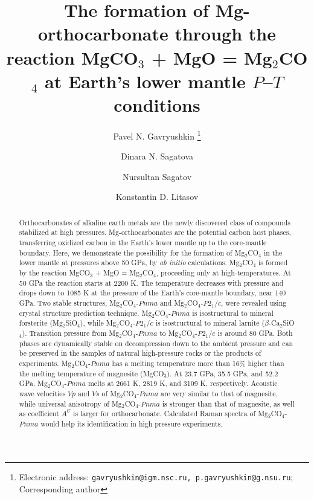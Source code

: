 \documentclass[a4paperm]{article}
\begin{document}

\title{The formation of Mg-orthocarbonate through the reaction MgCO$_3$ + MgO = Mg$_2$CO$_4$ at Earth's lower mantle $P$--$T$ conditions}


\author[1,2]{Pavel N. Gavryushkin
   \thanks{Electronic address: \texttt{gavryushkin@igm.nsc.ru, p.gavryushkin@g.nsu.ru}; Corresponding author}}     
\author[1,2]{Dinara N. Sagatova}
\author[1]{Nursultan Sagatov}
\author[3]{Konstantin D. Litasov}


\date{}
\maketitle


\begin{abstract}
Orthocarbonates of alkaline earth metals are the newly discovered class of compounds stabilized at high pressures.
Mg-orthocarbonates are the potential carbon host phases, transferring oxidized carbon in the Earth's lower mantle up to the core-mantle boundary.
Here, we demonstrate the possibility for the formation of Mg$_2$CO$_4$ in the lower mantle at pressures above 50 GPa, by {\it ab initio} calculations.
Mg$_2$CO$_4$ is formed by the reaction MgCO$_3$ + MgO = Mg$_2$CO$_4$, proceeding only at high-temperatures.
At 50 GPa the reaction starts at 2200 K.
The temperature decreases with pressure and drops down to 1085 K at the pressure of the Earth's core-mantle boundary, near 140 GPa.
Two stable structures, Mg$_2$CO$_4$-$Pnma$ and Mg$_2$CO$_4$-$P2_1/c$, were revealed using crystal structure prediction technique.
Mg$_2$CO$_4$-$Pnma$ is isostructural to mineral forsterite (Mg$_2$SiO$_4$), while Mg$_2$CO$_4$-$P2_1/c$ is isostructural to mineral larnite ($\beta$-Ca$_2$SiO$_4$).
Transition pressure from Mg$_2$CO$_4$-$Pnma$ to Mg$_2$CO$_4$-$P2_1/c$ is around 80 GPa.
Both phases are dynamically stable on decompression down to the ambient pressure and can be preserved in the samples of natural high-pressure rocks or the products of experiments.
Mg$_2$CO$_4$-$Pnma$ has a melting temperature more than 16\% higher  than the melting temperature of magnesite (MgCO$_3$).
At 23.7 GPa, 35.5 GPa, and 52.2 GPa, Mg$_2$CO$_4$-$Pnma$  melts at 2661 K, 2819 K, and 3109 K, respectively.
Acoustic wave velocities $Vp$ and $Vs$ of Mg$_2$CO$_4$-$Pnma$ are very similar to that of magnesite, while universal anisotropy of Mg$_2$CO$_4$-$Pnma$ is stronger than that of magnesite, as well as coefficient $A^U$ is larger for orthocarbonate.
{\color{blue}
Calculated Raman spectra of Mg$_2$CO$_4$-$Pnma$ would help its identification in high pressure experiments.
}


\end{abstract}
\end{document}
